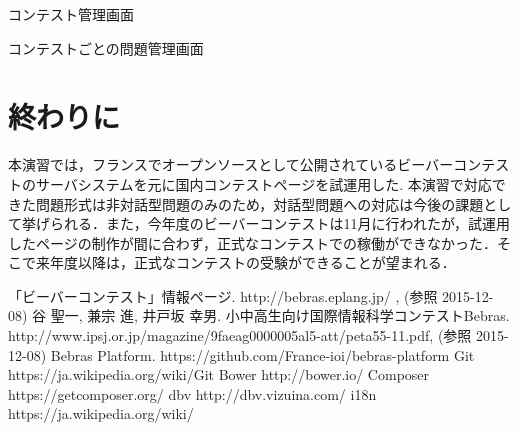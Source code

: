 \documentclass[a4paper]{jarticle}
\makeatletter
\newenvironment{figurehere}
  {\def\@captype{figure}}
  {}
\makeatother
\begin{document}
\begin{multicols}{2}
\begin{figurehere}
\begin{center}
\end{center}
\caption{コンテスト管理画面}\label{fig:11}
\end{figurehere}

\begin{figurehere}
\begin{center}
\end{center}
\caption{コンテストごとの問題管理画面}\label{fig:12}
\end{figurehere}

\section{終わりに}
本演習では，フランスでオープンソースとして公開されているビーバーコンテストのサーバシステムを元に国内コンテストページを試運用した. 本演習で対応できた問題形式は非対話型問題のみのため，対話型問題への対応は今後の課題として挙げられる．また，今年度のビーバーコンテストは11月に行われたが，試運用したページの制作が間に合わず，正式なコンテストでの稼働ができなかった．そこで来年度以降は，正式なコンテストの受験ができることが望まれる．

\end{multicols}

\begin{thebibliography}{1}

 「ビーバーコンテスト」情報ページ.  http://bebras.eplang.jp/ , (参照 2015-12-08)
 谷 聖一, 兼宗 進, 井戸坂 幸男. 小中高生向け国際情報科学コンテストBebras.  http://www.ipsj.or.jp/magazine/9faeag0000005al5-att/peta55-11.pdf, (参照 2015-12-08)
 Bebras Platform. https://github.com/France-ioi/bebras-platform
 Git  https://ja.wikipedia.org/wiki/Git
Bower  http://bower.io/
Composer  https://getcomposer.org/
dbv  http://dbv.vizuina.com/
i18n  https://ja.wikipedia.org/wiki/%



\end{thebibliography}
\end{document}
